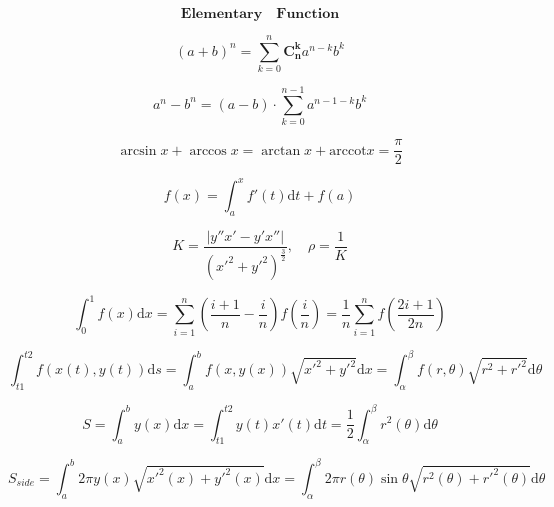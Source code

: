 \documentclass{article}
\begin{document}
    
\begin{displaymath}
    \bm{Elementary \quad Function}
\end{displaymath}

\begin{displaymath}
    (a+b)^n = \sum_{k=0}^n{\mathbf{C_{n}^{k}}a^{n-k}b^k}
\end{displaymath}

\begin{displaymath}
    a^{n}-b^{n} = (a-b) \cdot \sum_{k=0}^{n-1}a^{n-1-k}b^{k}
\end{displaymath}

\begin{displaymath}
    \arcsin x + \arccos x = \arctan x + \mathrm{arccot}x = \frac{\pi}{2} 
\end{displaymath}

\begin{displaymath}
    f(x) = \int_{a}^{x}f'(t) \mathrm{d}t + f(a)
\end{displaymath}

\begin{displaymath}
    K = \frac{|y''x'-y'x''|}{(x'^{2}+y'^{2})^{\frac{3}{2}}}, \quad \rho = \frac{1}{K}
\end{displaymath}

\begin{displaymath}
    \int_{0}^{1} f(x) \mathrm{d}x = \sum_{i=1}^{n}\left(\frac{i+1}{n}-\frac{i}{n}\right)f\left(\frac{i}{n}\right) = \frac{1}{n}\sum_{i=1}^{n}f\left(\frac{2i+1}{2n}\right)
\end{displaymath} 

\begin{displaymath}
    \int_{t1}^{t2} f(x(t),y(t)) \mathrm{d}s = \int_{a}^{b} f(x,y(x)) \sqrt{x'^2+y'^2} \mathrm{d}x = \int_{\alpha}^{\beta} f(r,\theta)\sqrt{r^2 + r'^2} \mathrm{d}\theta
\end{displaymath}

\begin{displaymath}
    S = \int_{a}^{b}y(x)\mathrm{d}x = \int_{t1}^{t2}y(t)x'(t)\mathrm{d}t = \frac{1}{2}\int_{\alpha}^{\beta}{r^2(\theta)}\mathrm{d}\theta 
\end{displaymath}

\begin{displaymath}
    S_{side} = \int_{a}^{b}2 \pi y(x)\sqrt{x'^2(x)+y'^2(x)} \mathrm{d}x = \int_{\alpha}^{\beta}{2\pi r(\theta)\sin \theta \sqrt{r^2(\theta)+r'^2(\theta)}} \mathrm{d}\theta 
\end{displaymath}
\end{document}
